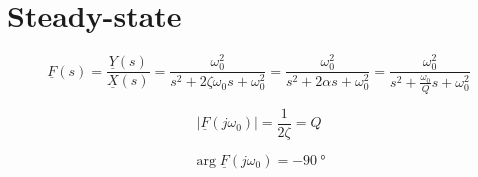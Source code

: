 \documentclass{article}[11pt]
\begin{document}
\section{Steady-state}

\begin{equation}\label{eq:fs}
\underline{F}(s) = \frac{\underline{Y}(s)}{\underline{X}(s)} 
                 = \frac{\omega_0^2}{s^2 + 2 \zeta \omega_0 s + \omega_0^2 }
                 = \frac{\omega_0^2}{s^2 + 2 \alpha s + \omega_0^2 }
                 = \frac{\omega_0^2}{s^2 + \frac{\omega_0}{Q} s + \omega_0^2 }
\end{equation}

\begin{equation}
\left|\underline{F}(j\omega_0)\right| = \frac{1}{2 \zeta} = Q
\end{equation}

\begin{equation}
\arg{\underline{F}(j\omega_0)} = -\SI{90}{\degree}
\end{equation}
\end{document}
